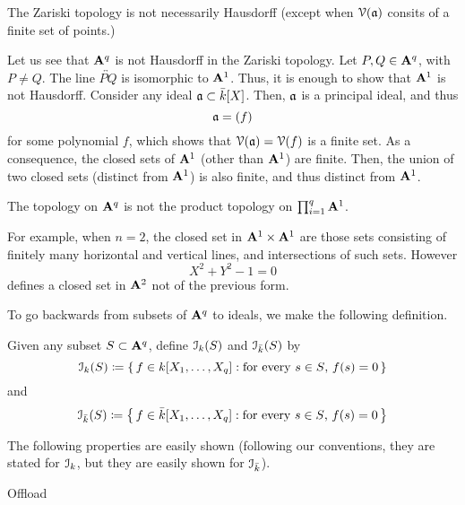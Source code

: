 The Zariski topology is not necessarily Hausdorff (except when $\mathcal{V}(\mathfrak{a})$
consits of a finite set of points.)

Let us see that $\mathbf{A}^q$ is not Hausdorff in the Zariski topology. Let
$P,Q\in\mathbf{A}^q$, with $P\neq Q$. The line $\overleftrightarrow{PQ}$ is
isomorphic to $\mathbf{A}^1$. Thus, it is enough to show that $\mathbf{A}^1$ is not
Hausdorff. Consider any ideal $\mathfrak{a}\subset\bar k[X]$. Then, $\mathfrak{a}$ is a
principal ideal, and thus
\[
\mathfrak{a}=(f)
\]
for some polynomial $f$, which shows that $\mathcal{V}(\mathfrak{a})=\mathcal{V}(f)$ is a finite
set. As a consequence, the closed sets of $\mathbf{A}^1$ (other than $\mathbf{A}^1$)
are finite. Then, the union of two closed sets (distinct from $\mathbf{A}^1$) is
also finite, and thus distinct from $\mathbf{A}^1$.

The topology on $\mathbf{A}^q$ is not the product topology on
$\prod_{i=1}^q\mathbf{A}^1$.

For example, when $n=2$, the closed set in $\mathbf{A}^1\times\mathbf{A}^1$ are those
sets consisting of finitely many horizontal and vertical lines, and
intersections of such sets. However
\[
X^2+Y^2-1=0
\]
defines a closed set in $\mathbf{A}^2$ not of the previous form.

To go backwards from subsets of $\mathbf{A}^q$ to ideals, we make the following
definition.
\begin{definition}
 Given any subset $S\subset\mathbf{A}^q$, define $\mathcal{I}_k(S)$ and $\mathcal{I}_{\bar
   k}(S)$ by
\[
\mathcal{I}_k(S)\coloneqq\left\{\,f\in k[X_1,\dotsc,X_q]:
\text{for every $s\in S$, $f(s)=0$}\,\right\}
\]
and
\[
\mathcal{I}_{\bar k}(S)\coloneqq\left\{\,f\in\bar k[X_1,\dotsc,X_q]:
\text{for every $s\in S$, $f(s)=0$}\,\right\}
\]
\end{definition}

The following properties are easily shown (following our conventions, they
are stated for $\mathcal{I}_k$, but they are easily shown for $\mathcal{I}_{\bar k}$).

Offload

